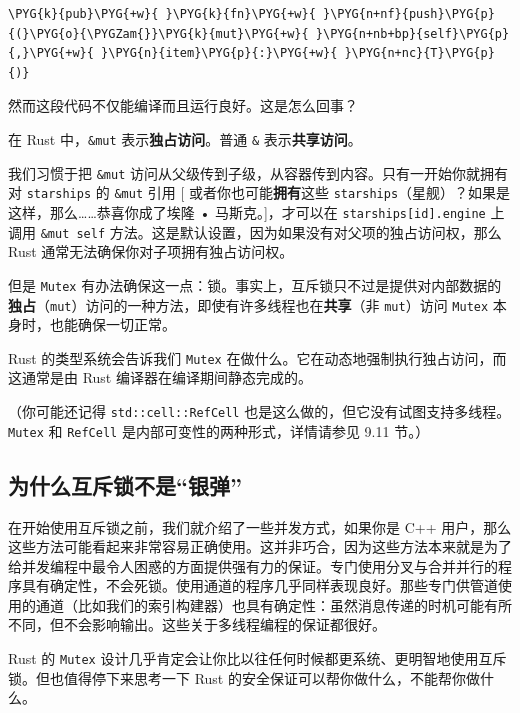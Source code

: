 \begin{Verbatim}[commandchars=\\\{\},breaklines=true,breakanywhere=true,fontsize=\codefont,xleftmargin=17bp]
\PYG{k}{pub}\PYG{+w}{ }\PYG{k}{fn}\PYG{+w}{ }\PYG{n+nf}{push}\PYG{p}{(}\PYG{o}{\PYGZam{}}\PYG{k}{mut}\PYG{+w}{ }\PYG{n+nb+bp}{self}\PYG{p}{,}\PYG{+w}{ }\PYG{n}{item}\PYG{p}{:}\PYG{+w}{ }\PYG{n+nc}{T}\PYG{p}{)}
\end{Verbatim}

然而这段代码不仅能编译而且运行良好。这是怎么回事？

在 Rust 中，\texttt{\&mut} 表示\textbf{独占访问}。普通 \texttt{\&} 表示\textbf{共享访问}。

我们习惯于把 \texttt{\&mut} 访问从父级传到子级，从容器传到内容。只有一开始你就拥有对 \texttt{starships} 的 \texttt{\&mut} 引用 [ 或者你也可能\textbf{拥有}这些 \texttt{starships}（星舰）？如果是这样，那么……恭喜你成了埃隆 • 马斯克。]，才可以在 \texttt{starships[id].engine} 上调用 \texttt{\&mut self} 方法。这是默认设置，因为如果没有对父项的独占访问权，那么 Rust 通常无法确保你对子项拥有独占访问权。

但是 \texttt{Mutex} 有办法确保这一点：锁。事实上，互斥锁只不过是提供对内部数据的\textbf{独占}（\texttt{mut}）访问的一种方法，即使有许多线程也在\textbf{共享}（非 \texttt{mut}）访问 \texttt{Mutex} 本身时，也能确保一切正常。

Rust 的类型系统会告诉我们 \texttt{Mutex} 在做什么。它在动态地强制执行独占访问，而这通常是由 Rust 编译器在编译期间静态完成的。

（你可能还记得 \texttt{std::cell::RefCell} 也是这么做的，但它没有试图支持多线程。\texttt{Mutex} 和 \texttt{RefCell} 是内部可变性的两种形式，详情请参见 9.11 节。）

\subsection{为什么互斥锁不是“银弹”}

在开始使用互斥锁之前，我们就介绍了一些并发方式，如果你是 C++ 用户，那么这些方法可能看起来非常容易正确使用。这并非巧合，因为这些方法本来就是为了给并发编程中最令人困惑的方面提供强有力的保证。专门使用分叉与合并并行的程序具有确定性，不会死锁。使用通道的程序几乎同样表现良好。那些专门供管道使用的通道（比如我们的索引构建器）也具有确定性：虽然消息传递的时机可能有所不同，但不会影响输出。这些关于多线程编程的保证都很好。

Rust 的 \texttt{Mutex} 设计几乎肯定会让你比以往任何时候都更系统、更明智地使用互斥锁。但也值得停下来思考一下 Rust 的安全保证可以帮你做什么，不能帮你做什么。

